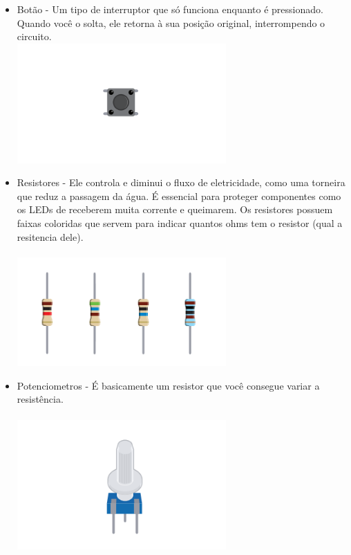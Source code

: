 \documentclass{report}
\begin{document}
\begin{itemize}
		\item Botão - Um tipo de interruptor que só funciona enquanto é pressionado. Quando você o solta, ele retorna à sua posição original, interrompendo o circuito. \\
		\includegraphics[width=8cm]{imagens/botao.png}
		
		\item Resistores - Ele controla e diminui o fluxo de eletricidade, como uma torneira que reduz a passagem da água. É essencial para proteger componentes como os LEDs de receberem muita corrente e queimarem. Os resistores possuem faixas coloridas que servem para indicar quantos ohms tem o resistor (qual a resitencia dele). \\ \\
		\includegraphics[width=8cm]{imagens/resistores.png}
		
		\item Potenciometros - É basicamente um resistor que você consegue variar a resistência. \\ \\
		\includegraphics[width=8cm]{imagens/potenciometro.png}
		

\end{itemize}
\end{document}

